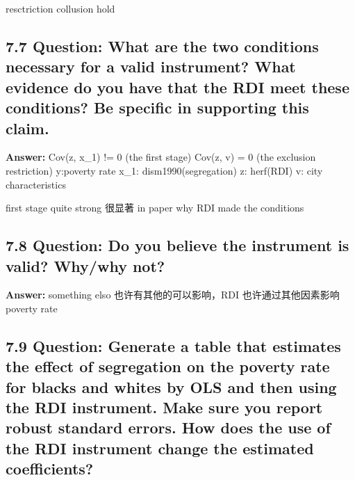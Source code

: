\documentclass[
]{article}
\begin{document}
resctriction collusion hold

\clearpage

\hypertarget{question-what-are-the-two-conditions-necessary-for-a-valid-instrument-what-evidence-do-you-have-that-the-rdi-meet-these-conditions-be-specific-in-supporting-this-claim.}{%
\subsection{7.7 Question: What are the two conditions necessary for a
valid instrument? What evidence do you have that the RDI meet these
conditions? Be specific in supporting this
claim.}\label{question-what-are-the-two-conditions-necessary-for-a-valid-instrument-what-evidence-do-you-have-that-the-rdi-meet-these-conditions-be-specific-in-supporting-this-claim.}}

\textbf{Answer:} Cov(z, x\_1) != 0 (the first stage) Cov(z, v) = 0 (the
exclusion restriction) y:poverty rate x\_1: dism1990(segregation) z:
herf(RDI) v: city characteristics

first stage quite strong 很显著 in paper why RDI made the conditions

\clearpage

\hypertarget{question-do-you-believe-the-instrument-is-valid-whywhy-not}{%
\subsection{7.8 Question: Do you believe the instrument is valid?
Why/why
not?}\label{question-do-you-believe-the-instrument-is-valid-whywhy-not}}

\textbf{Answer:} something elso 也许有其他的可以影响，RDI
也许通过其他因素影响 poverty rate

\clearpage

\hypertarget{question-generate-a-table-that-estimates-the-effect-of-segregation-on-the-poverty-rate-for-blacks-and-whites-by-ols-and-then-using-the-rdi-instrument.-make-sure-you-report-robust-standard-errors.-how-does-the-use-of-the-rdi-instrument-change-the-estimated-coefficients}{%
\subsection{7.9 Question: Generate a table that estimates the effect of
segregation on the poverty rate for blacks and whites by OLS and then
using the RDI instrument. Make sure you report robust standard errors.
How does the use of the RDI instrument change the estimated
coefficients?}\label{question-generate-a-table-that-estimates-the-effect-of-segregation-on-the-poverty-rate-for-blacks-and-whites-by-ols-and-then-using-the-rdi-instrument.-make-sure-you-report-robust-standard-errors.-how-does-the-use-of-the-rdi-instrument-change-the-estimated-coefficients}}
\end{document}
